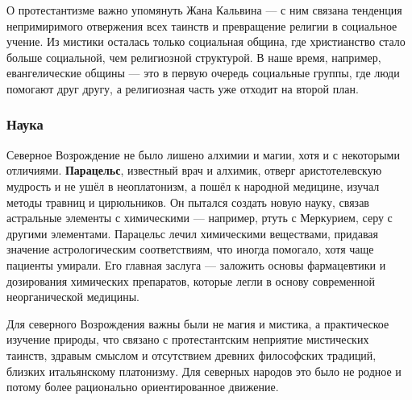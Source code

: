 О протестантизме важно упомянуть Жана Кальвина --- с ним связана тенденция непримиримого отвержения всех таинств и превращение религии в социальное учение. Из мистики осталась только социальная община, где христианство стало больше социальной, чем религиозной структурой. В наше время, например, евангелические общины --- это в первую очередь социальные группы, где люди помогают друг другу, а религиозная часть уже отходит на второй план.

\subsubsection{Наука}

Северное Возрождение не было лишено алхимии и магии, хотя и с некоторыми отличиями. \textbf{Парацельс}, известный врач и алхимик, отверг аристотелевскую мудрость и не ушёл в неоплатонизм, а пошёл к народной медицине, изучал методы травниц и цирюльников. Он пытался создать новую науку, связав астральные элементы с химическими --- например, ртуть с Меркурием, серу с другими элементами. Парацельс лечил химическими веществами, придавая значение астрологическим соответствиям, что иногда помогало, хотя чаще пациенты умирали. Его главная заслуга --- заложить основы фармацевтики и дозирования химических препаратов, которые легли в основу современной неорганической медицины.

Для северного Возрождения важны были не магия и мистика, а практическое изучение природы, что связано с протестантским неприятие мистических таинств, здравым смыслом и отсутствием древних философских традиций, близких итальянскому платонизму. Для северных народов это было не родное и потому более рационально ориентированное движение.

